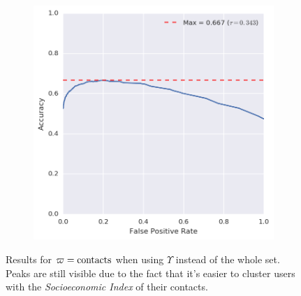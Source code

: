 \begin{figure}[!h]
\begin{subfigure}[b]{.49\textwidth}
	\includegraphics[height=.175\textheight]{figures/bayes/least1/accuracy_contacts.png}
\end{subfigure}
\caption{Results for $\varpi = \operatorname{contacts}$ when using $\hat{\Upsilon}$ instead of the whole set. Peaks are still visible due to the fact that it's easier to cluster users with the \emph{Socioeconomic Index} of their contacts.}
\end{figure}

